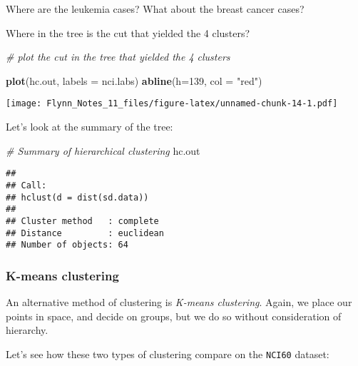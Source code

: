 \documentclass[]{article}
\newenvironment{Shaded}{\begin{snugshade}}{\end{snugshade}}
\newcommand{\KeywordTok}[1]{\textcolor[rgb]{0.13,0.29,0.53}{\textbf{#1}}}
\newcommand{\DataTypeTok}[1]{\textcolor[rgb]{0.13,0.29,0.53}{#1}}
\newcommand{\DecValTok}[1]{\textcolor[rgb]{0.00,0.00,0.81}{#1}}
\newcommand{\StringTok}[1]{\textcolor[rgb]{0.31,0.60,0.02}{#1}}
\newcommand{\CommentTok}[1]{\textcolor[rgb]{0.56,0.35,0.01}{\textit{#1}}}
\newcommand{\OperatorTok}[1]{\textcolor[rgb]{0.81,0.36,0.00}{\textbf{#1}}}
\newcommand{\NormalTok}[1]{#1}
\begin{document}
Where are the leukemia cases? What about the breast cancer cases?

Where in the tree is the cut that yielded the 4 clusters?

\begin{Shaded}
\begin{Highlighting}[]
\CommentTok{# plot the cut in the tree that yielded the 4 clusters}

\KeywordTok{plot}\NormalTok{(hc.out, }\DataTypeTok{labels =}\NormalTok{ nci.labs)}
\KeywordTok{abline}\NormalTok{(}\DataTypeTok{h=}\DecValTok{139}\NormalTok{, }\DataTypeTok{col =} \StringTok{"red"}\NormalTok{)}
\end{Highlighting}
\end{Shaded}

\texttt{[image: Flynn\_Notes\_11\_files/figure-latex/unnamed-chunk-14-1.pdf]}

Let's look at the summary of the tree:

\begin{Shaded}
\begin{Highlighting}[]
\CommentTok{# Summary of hierarchical clustering}
\NormalTok{hc.out}
\end{Highlighting}
\end{Shaded}

\begin{verbatim}
## 
## Call:
## hclust(d = dist(sd.data))
## 
## Cluster method   : complete 
## Distance         : euclidean 
## Number of objects: 64
\end{verbatim}

\subsubsection{K-means clustering}\label{k-means-clustering}

An alternative method of clustering is \emph{K-means clustering}. Again,
we place our points in space, and decide on groups, but we do so without
consideration of hierarchy.

Let's see how these two types of clustering compare on the
\texttt{NCI60} dataset:

\begin{Shaded}
\end{Shaded}
\end{document}
